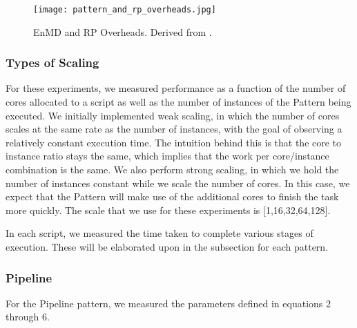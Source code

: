 \documentclass[]{article}
\begin{document}
			\begin{figure}[H]
				\centering
				\texttt{[image: pattern\_and\_rp\_overheads.jpg]}
				\caption{EnMD and RP Overheads. Derived from \cite{rp_state_diagram}.}
				\label{fig:pattern_rp_overheads}
			\end{figure}

		\subsubsection{Types of Scaling}
			For these experiments, we measured performance as a function of the number of cores allocated to a script as well as the number of instances of the Pattern being executed. We initially implemented weak scaling, in which the number of cores scales at the same rate as the number of instances, with the goal of observing a relatively constant execution time. The intuition behind this is that the core to instance ratio stays the same, which implies that the work per core/instance combination is the same. We also perform strong scaling, in which we hold the number of instances constant while we scale the number of cores. In this case, we expect that the Pattern will make use of the additional cores to finish the task more quickly. The scale that we use for these experiments is [1,16,32,64,128].

			In each script, we measured the time taken to complete various stages of execution. These will be elaborated upon in the subsection for each pattern.

		\subsubsection{Pipeline}
			For the Pipeline pattern, we measured the parameters defined in equations 2 through 6. 
\end{document}
